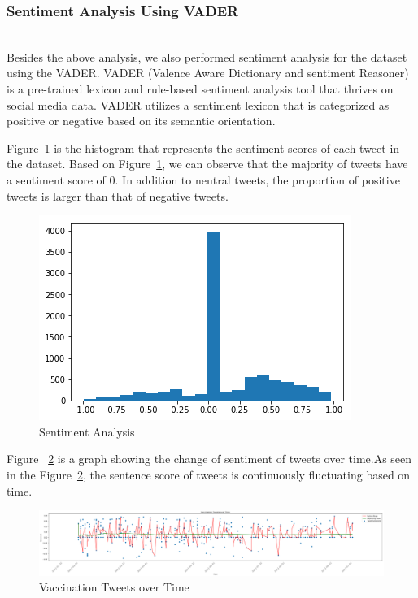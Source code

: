 \documentclass[sigplan,screen]{acmart}
\begin{document}
\subsubsection{Sentiment Analysis Using VADER}
~\\
Besides the above analysis, we also performed sentiment analysis for the dataset using the VADER. VADER (Valence Aware Dictionary and sentiment Reasoner) is a pre-trained lexicon and rule-based sentiment analysis tool that thrives on social media data. VADER utilizes a sentiment lexicon that is categorized as positive or negative based on its semantic orientation{\cite{vader}}. 

Figure~\ref{fig:4} is the histogram that represents the sentiment scores of each tweet in the dataset. Based on Figure~\ref{fig:4}, we can observe that the majority of tweets have a sentiment score of 0. In addition to neutral tweets, the proportion of positive tweets is larger than that of negative tweets.
\begin{figure}[h]
  \centering
  \includegraphics[width=0.65\linewidth]{resource/xinran/Sentiment_Analysis.png}
  \caption{Sentiment Analysis}
  \label{fig:4}
\end{figure}

Figure ~\ref{fig:5} is a graph showing the change of sentiment of tweets over time.As seen in the Figure~\ref{fig:5}, the sentence score of tweets is continuously fluctuating based on time.
\begin{figure}[h]
  \centering
  \includegraphics[width=1.0\linewidth]{resource/xinran/Vaccination_Tweets_over_Time.png}
  \caption{Vaccination Tweets over Time}
  \label{fig:5}
\end{figure}
\end{document}
